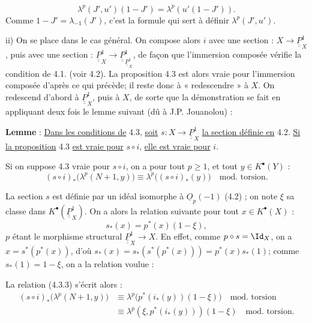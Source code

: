 
\[
  \lambda^p(J',u')(1-J')=\lambda^p(u'(1-J')).
\]
Comme \(1-J'=\lambda_{-1}(J')\), c'est la formule qui sert à définir \(\lambda^p(J',u')\).

ii) On se place dans le cas général. On compose alors \(i\) avec une section : \(X\to\underline{\underline{P}}_X^1\), puis avec une section : \(\underline{\underline{P}}_X^1\to\underline{\underline{P}}_{\underline{\underline{P}}_X^1}^1\), de façon que l'immersion composée vérifie la condition de 4.1. (voir 4.2). La proposition 4.3 est alors vraie pour l'immersion composée d'après ce qui précède; il reste donc à « redescendre » à \(X\). On redescend d'abord à \(\underline{\underline{P}}_X^1\), puis à \(X\), de sorte que la démonstration se fait en appliquant deux fois le lemme suivant (dû à J.P. Jouanolou) :

\textbf{Lemme} : \uline{Dans les conditions de} 4.3, \uline{soit} \(s:X\to\underline{\underline{P}}_X^1\) \uline{la section définie en} 4.2. \uline{Si la proposition} 4.3 \uline{est vraie pour} \(s\circ i\), \uline{elle est vraie pour} \(i\).

Si on suppose 4.3 vraie pour \(s\circ i\), on a pour tout \(p\ge1\), et tout \(y\in K^{\bullet}(Y)\) :
\begin{equation}\tag{4.3.3}
 (s\circ i)_*\bigl(\lambda^p(N+1,y)\bigr)
 \equiv
 \lambda^p\bigl((s\circ i)_*(y)\bigr)
 \quad\text{mod.\ torsion}.
\end{equation}

La section \(s\) est définie par un idéal isomorphe à \(\underline{O}_p(-1)\) (4.2) ; on note \(\xi\) sa classe dans \(K^{\bullet}(\underline{\underline{P}}_X^1)\). On a alors la relation suivante pour tout \(x\in K^{\bullet}(X)\) :
\[
  s_*(x)=p^*(x)(1-\xi),
\]
\(p\) étant le morphisme structural \(\underline{\underline{P}}_X^1\to X\). En effet, comme \(p\circ s=\Id_X\), on a \(x=s^*(p^*(x))\), d'où \(s_*(x)=s_*(s^*(p^*(x)))=p^*(x)s_*(1)\); comme \(s_*(1)=1-\xi\), on a la relation voulue :

La relation (4.3.3) s'écrit alors :
\[
\begin{aligned}
(s\circ i)_*\bigl(\lambda^p(N+1,y)\bigr)
&\equiv \lambda^p\bigl(p^*(i_*(y))(1-\xi)\bigr)\quad\text{mod.\ torsion}\\
&\equiv \lambda^p(\xi,p^*(i_*(y)))(1-\xi)\quad\text{mod.\ torsion}.
\end{aligned}
\]
